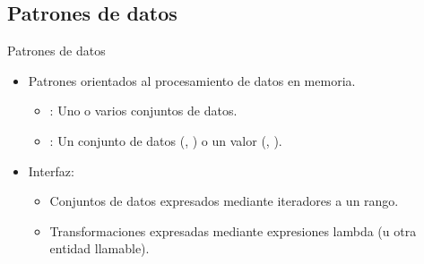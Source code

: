 \subsection{Patrones de datos}

\begin{frame}[t]{Patrones de datos}
\begin{itemize}
  \item Patrones orientados al procesamiento de datos en memoria.
    \begin{itemize}
      \item {}: Uno o varios conjuntos de datos.
      \item {}: Un conjunto de datos (, ) o un valor
            (, ).
    \end{itemize}
  \vfill\pause
  \item Interfaz:
    \begin{itemize}
      \item Conjuntos de datos expresados mediante iteradores a un rango.
      \item Transformaciones expresadas mediante expresiones lambda (u otra entidad llamable).
    \end{itemize}
\end{itemize}
\end{frame}





